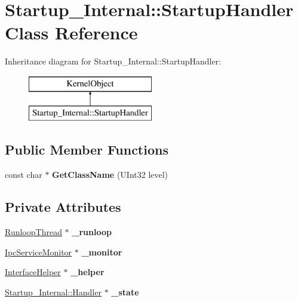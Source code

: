 \hypertarget{class_startup___internal_1_1_startup_handler}{}\section{Startup\+\_\+\+Internal\+:\+:Startup\+Handler Class Reference}
\label{class_startup___internal_1_1_startup_handler}
Inheritance diagram for Startup\+\_\+\+Internal\+:\+:Startup\+Handler\+:\begin{figure}[H]
\begin{center}
\leavevmode
\includegraphics[height=2.000000cm]{class_startup___internal_1_1_startup_handler}
\end{center}
\end{figure}
\subsection*{Public Member Functions}
\begin{DoxyCompactItemize}
\item 
\mbox{\label{class_startup___internal_1_1_startup_handler_a15f8adf225f4cf3a0285f168f395c695}} 
const char $\ast$ {\bfseries Get\+Class\+Name} (U\+Int32 level)
\end{DoxyCompactItemize}
\subsection*{Private Attributes}
\begin{DoxyCompactItemize}
\item 
\mbox{\label{class_startup___internal_1_1_startup_handler_a498422063a1b548f19814a4c4b2d2b8c}} 
\hyperlink{class_runloop_thread}{Runloop\+Thread} $\ast$ {\bfseries \+\_\+runloop}
\item 
\mbox{\label{class_startup___internal_1_1_startup_handler_aa5fb572fec0c82356918af4cf07d3a89}} 
\hyperlink{class_ipc_service_monitor}{Ipc\+Service\+Monitor} $\ast$ {\bfseries \+\_\+monitor}
\item 
\mbox{\label{class_startup___internal_1_1_startup_handler_a2f380819519d5df28548da3268c2f8eb}} 
\hyperlink{class_interface_helper}{Interface\+Helper} $\ast$ {\bfseries \+\_\+helper}
\item 
\mbox{\label{class_startup___internal_1_1_startup_handler_a075dc515f838ed5a49b39107150a2526}} 
\hyperlink{class_startup___internal_1_1_handler}{Startup\+\_\+\+Internal\+::\+Handler} $\ast$ {\bfseries \+\_\+state}
\end{DoxyCompactItemize}

